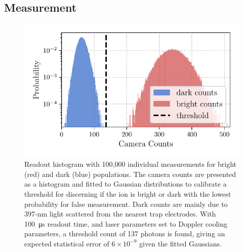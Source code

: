 \subsection{Measurement}
\label{sec:Measurement}
    \begin{figure}
        \begin{center}
        \noindent\includegraphics[width=0.75\linewidth]{
            figures/pdf_figure/readout_hist.pdf
            }
        \end{center}
        \caption{
            Readout histogram with 100,000 individual measurements for bright (red) and dark (blue) populations. The camera counts are presented as a histogram and fitted to Gaussian distributions to calibrate a threshold for discerning if the ion is bright or dark with the lowest probability for false measurement. Dark counts are mainly due to 397-nm light scattered from the nearest trap electrodes. With 100~\unit{\us} readout time, and laser parameters set to Doppler cooling parameters, a threshold count of 137 photons is found, giving an expected statistical error of $6\times 10^{-9}$ given the fitted Gaussians. %
            }
        \label{fig:readout_histogram}
    \end{figure}

